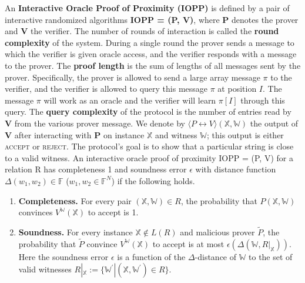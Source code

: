 \begin{definition}
An \textbf{Interactive Oracle Proof of Proximity (IOPP)} is defined by a pair of interactive randomized
algorithms \textbf{IOPP = (P, V)}, where \textbf{P} denotes the prover and \textbf{V} the verifier. 
The number of rounds of interaction is called the \textbf{round complexity} of the system. 
During a single round the prover sends a message to which the verifier is given oracle access, and the verifier responds with a message to the prover. 
The \textbf{proof length} is the sum of lengths of all messages sent by the prover. Specifically, the prover is allowed to send a large array message $\pi$ to the verifier, and the verifier is allowed to query this message $\pi$ at position $I$. The message $\pi$ will work as an oracle and the verifier will learn $\pi[I]$ through this query.
The \textbf{query complexity} of the protocol is the number of entries read by \textbf{V} from the various prover message.
We denote by $\langle P \leftrightarrow V \rangle (\mathbb{X}, \mathbb{W})$ the output of \textbf{V} after interacting with \textbf{P} on instance $\mathbb{X}$ and witness $\mathbb{W}$; this output is either \textsc{accept} or \textsc{reject}.
The protocol's goal is to show that a particular string is close to a valid witness.
An interactive oracle proof of proximity IOPP = (P, V) for a relation R has completeness 1 and soundness error $\epsilon$ with distance function $\Delta(w_1, w_2) \in \mathbb{F}$ ($w_1, w_2 \in \mathbb{F}^N$) if the following holds.

\begin{enumerate}
    \item \textbf{Completeness.}
    For every pair $(\mathbb{X}, \mathbb{W}) \in R$, the probability that $P(\mathbb{X}, \mathbb{W})$ convinces $V^{\mathbb{W}}(\mathbb{X})$ to accept is 1.
    
    \item \textbf{Soundness.}
    For every instance $\mathbb{X} \not\in L(R)$ and malicious prover $\tilde{P}$, the probability that $\tilde{P}$ convince $V^{\mathbb{W}}(\mathbb{X})$ to accept is at most $\epsilon(\Delta(\mathbb{W}, R|_{\mathbb{X}}))$. Here the soundness error $\epsilon$ is a function of the $\Delta$-distance of $\mathbb{W}$ to the set of valid witnesses $R|_{\mathbb{X}} := \{ \mathbb{W}^\prime | (\mathbb{X}, \mathbb{W}^\prime) \in R \}$.
\end{enumerate}
\end{definition}


